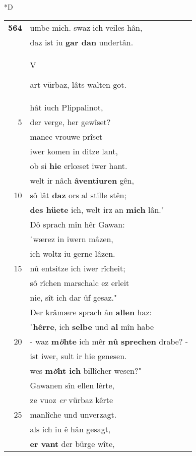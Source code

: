 \documentclass[8pt,a4paper,notitlepage]{article}
\begin{document}
\begin{table}[ht]
\begin{minipage}[t]{0.5\linewidth}
\small
\begin{center}*D
\end{center}
\begin{tabular}{rl}
\textbf{564} & umbe mich. swaz ich veiles hân,\\ 
 & daz ist iu \textbf{gar dan} undertân.\\ 
 & \begin{large}V\end{large}art vürbaz, lâts walten got.\\ 
 & hât iuch Plippalinot,\\ 
5 & der verge, her gewîset?\\ 
 & manec vrouwe prîset\\ 
 & iwer komen in ditze lant,\\ 
 & ob si \textbf{hie} erlœset iwer hant.\\ 
 & welt ir nâch \textbf{âventiuren} gên,\\ 
10 & sô lât \textbf{daz} ors al stille stên;\\ 
 & \textbf{des hüete} ich, welt irz an \textbf{mich} lân."\\ 
 & Dô sprach mîn hêr Gawan:\\ 
 & "wærez in iwern mâzen,\\ 
 & ich woltz iu gerne lâzen.\\ 
15 & nû entsitze ich iwer rîcheit;\\ 
 & sô rîchen marschalc ez erleit\\ 
 & nie, sît ich dar ûf gesaz."\\ 
 & Der krâmære sprach ân \textbf{allen} haz:\\ 
 & "\textbf{hêrre}, ich \textbf{selbe} und \textbf{al} mîn habe\\ 
20 & - waz \textbf{m\textit{ö}hte} ich mêr \textbf{nû} \textbf{sprechen} drabe? -\\ 
 & ist iwer, sult ir hie genesen.\\ 
 & wes \textbf{m\textit{ö}ht ich} billîcher wesen?"\\ 
 & Gawanen sîn ellen lêrte,\\ 
 & ze vuoz \textit{er} vürbaz kêrte\\ 
25 & manlîche und unverzagt.\\ 
 & als ich iu ê hân gesagt,\\ 
 & \textbf{er vant} der bürge wîte,\\ 

\end{tabular}
\end{minipage}
\end{table}
\end{document}
